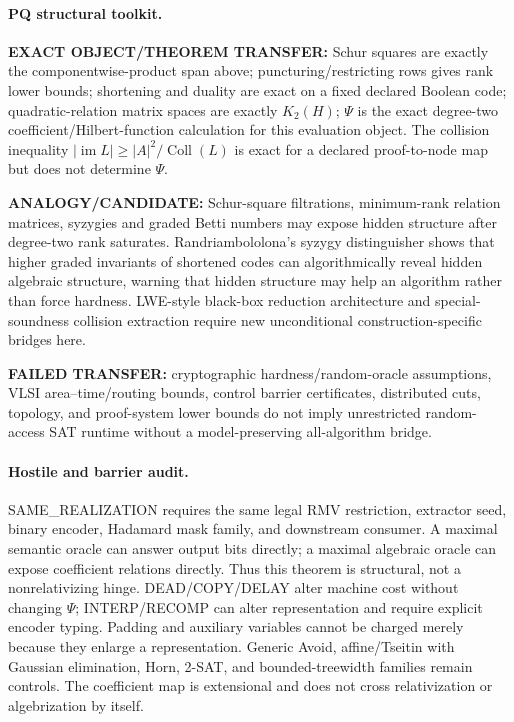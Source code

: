 \documentclass[11pt]{article}
\begin{document}
\paragraph{PQ structural toolkit.}
\textbf{EXACT OBJECT/THEOREM TRANSFER:} Schur squares are exactly the componentwise-product span above; puncturing/restricting rows gives rank lower bounds; shortening and duality are exact on a fixed declared Boolean code; quadratic-relation matrix spaces are exactly $K_2(H)$; $\Psi$ is the exact degree-two coefficient/Hilbert-function calculation for this evaluation object. The collision inequality $|\operatorname{im}L|\ge |A|^2/\operatorname{Coll}(L)$ is exact for a declared proof-to-node map but does not determine $\Psi$.

\textbf{ANALOGY/CANDIDATE:} Schur-square filtrations, minimum-rank relation matrices, syzygies and graded Betti numbers may expose hidden structure after degree-two rank saturates. Randriambololona's syzygy distinguisher shows that higher graded invariants of shortened codes can algorithmically reveal hidden algebraic structure, warning that hidden structure may help an algorithm rather than force hardness. LWE-style black-box reduction architecture and special-soundness collision extraction require new unconditional construction-specific bridges here.

\textbf{FAILED TRANSFER:} cryptographic hardness/random-oracle assumptions, VLSI area--time/routing bounds, control barrier certificates, distributed cuts, topology, and proof-system lower bounds do not imply unrestricted random-access SAT runtime without a model-preserving all-algorithm bridge.

\paragraph{Hostile and barrier audit.}
SAME\_REALIZATION requires the same legal RMV restriction, extractor seed, binary encoder, Hadamard mask family, and downstream consumer. A maximal semantic oracle can answer output bits directly; a maximal algebraic oracle can expose coefficient relations directly. Thus this theorem is structural, not a nonrelativizing hinge. DEAD/COPY/DELAY alter machine cost without changing $\Psi$; INTERP/RECOMP can alter representation and require explicit encoder typing. Padding and auxiliary variables cannot be charged merely because they enlarge a representation. Generic Avoid, affine/Tseitin with Gaussian elimination, Horn, 2-SAT, and bounded-treewidth families remain controls. The coefficient map is extensional and does not cross relativization or algebrization by itself.
\end{document}
